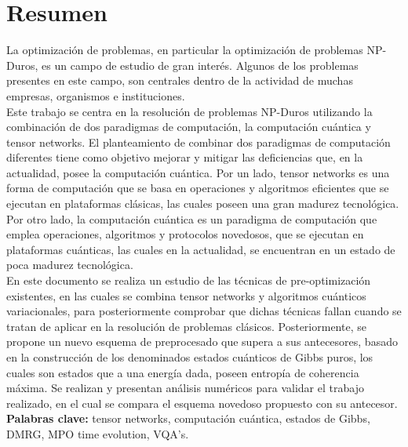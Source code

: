\chapter{Resumen}

La optimización de problemas, en particular la optimización de problemas NP-Duros, es un campo de estudio de gran interés. Algunos de los problemas presentes en este campo, son centrales dentro de la actividad de muchas empresas, organismos e instituciones. \\

Este trabajo se centra en la resolución de problemas NP-Duros utilizando la combinación de dos paradigmas de computación, la computación cuántica y tensor networks. El planteamiento de combinar dos paradigmas de computación diferentes tiene como objetivo mejorar y mitigar las deficiencias que, en la actualidad, posee la computación cuántica. Por un lado, tensor networks es una forma de computación que se basa en operaciones y algoritmos eficientes que se ejecutan en plataformas clásicas, las cuales poseen una gran madurez tecnológica. Por otro lado, la computación cuántica es un paradigma de computación que emplea operaciones, algoritmos y protocolos novedosos, que se ejecutan en plataformas cuánticas, las cuales en la actualidad, se encuentran en un estado de poca madurez tecnológica. \\

En este documento se realiza un estudio de las técnicas de pre-optimización existentes, en las cuales se combina tensor networks y algoritmos cuánticos variacionales, para posteriormente comprobar que dichas técnicas fallan cuando se tratan de aplicar en la resolución de problemas clásicos. Posteriormente, se propone un nuevo esquema de preprocesado que supera a sus antecesores, basado en la construcción de los denominados estados cuánticos de Gibbs puros, los cuales son estados que a una energía dada, poseen entropía de coherencia máxima. Se realizan y presentan análisis numéricos para validar el trabajo realizado, en el cual se compara el esquema novedoso propuesto con su antecesor. \\

{\bf Palabras clave:} tensor networks, computación  cuántica, estados de Gibbs, DMRG, MPO time evolution, VQA's.